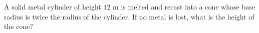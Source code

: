 A solid metal cylinder of height $12$ m is melted and recast into a cone whose base radius is twice the radius of the cylinder. If no metal is lost, what is the height of the cone?
